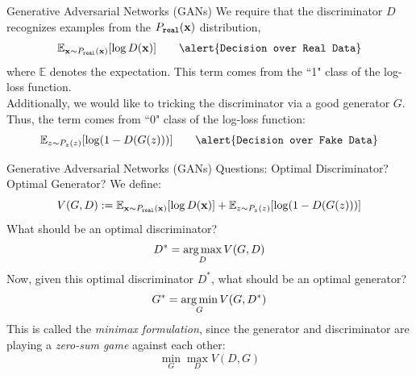 \documentclass[handout,xcolor=pdftex,dvipsnames,table,mathserif]{beamer}
\begin{document}
\begin{frame}{Generative Adversarial Networks (GANs)}
We require that the discriminator $D$ recognizes examples from the $P_{\texttt{real}}(\mathbf{x})$ distribution,
\begin{equation*}
\mathbb{E}_{\x \sim P_{\texttt{real}}(\x)}[\log D(\x)]  \quad \quad \alert{\texttt{Decision over Real Data}}
\end{equation*} where $\mathbb{E}$ denotes the expectation. This term comes from the ``1" class  of the log-loss function. \\
Additionally, we would like to tricking the discriminator via a good generator $G$. Thus, the term comes from  ``0" class of the log-loss function:
\begin{equation*}
\mathbb{E}_{z \sim P_{z}(z)}[ \log (1-D(G(z)))]  \quad \quad  \alert{\texttt{Decision over Fake Data}}
\end{equation*}
\end{frame}

\begin{frame}{Generative Adversarial Networks (GANs)}
Questions: Optimal Discriminator? Optimal Generator?
We define:
\begin{equation*}
V(G,D):= \mathbb{E}_{\mathbf{x} \sim P_{\texttt{real}}(\mathbf{x})}[\log D(\mathbf{x})] + \mathbb{E}_{z \sim P_{z}(z)}[ \log (1-D(G(z)))]
\end{equation*}
What should be an optimal discriminator? \pause
\begin{equation*}
D^* = \operatorname*{arg\,max}_{D} V(G,D)
\end{equation*}
Now, given this optimal discriminator $D^*$, what should be an optimal generator? \pause
\begin{equation*}
G^* = \operatorname*{arg\,min}_{G} V(G,D^*)
\end{equation*}
This is called the \emph{minimax formulation}, since the generator and discriminator are playing a \emph{zero-sum game} against each other:
\begin{equation}
\min_{G} \max _{D} V(D,G)
\end{equation}
\end{frame}
\end{document}

